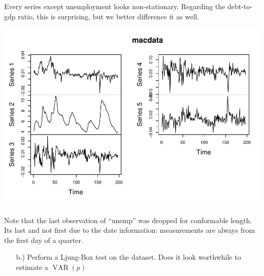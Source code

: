 \documentclass[12pt,a4paper]{article}
\newcommand{\VAR}{\operatorname{VAR}} %
\newenvironment{Shaded}{\begin{snugshade}}{\end{snugshade}}
\newcommand{\KeywordTok}[1]{\textcolor[rgb]{0.13,0.29,0.53}{\textbf{#1}}}
\newcommand{\NormalTok}[1]{#1}
\newcommand{\OperatorTok}[1]{\textcolor[rgb]{0.81,0.36,0.00}{\textbf{#1}}}
\newcommand{\StringTok}[1]{\textcolor[rgb]{0.31,0.60,0.02}{#1}}
\begin{document}
Every series except unemployment looks non-stationary. Regarding the
debt-to-gdp ratio, this is surprising, but we better difference it as
well.

\begin{Shaded}
\end{Shaded}

\includegraphics{solution_exercise_5_files/figure-latex/unnamed-chunk-4-1.pdf}

Note that the last observation of \enquote{unemp} was dropped for
conformable length. Its last and not first due to the date information:
measurements are always from the first day of a quarter.

\begin{itemize}
  \item[b.)] Perform a Ljung-Box test on the dataset. Does it look worthwhile to estimate a $\VAR(p)$
\end{itemize}
\end{document}
